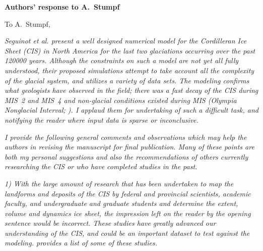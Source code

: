 


\textbf{Authors' response to A.~Stumpf}
\bigskip


\newcommand{\sechead}[1]{\bigskip\noindent\textbf{#1}}
\newcommand{\referee}[1]{\bigskip\textcolor{journalname}{\textit{#1}}}
\newcommand{\msquote}[1]{\begin{quote}\textit{#1}\end{quote}}

To A.~Stumpf,

\referee{%
    Seguinot et al. present a well designed numerical model for the Cordilleran
    Ice Sheet (CIS) in North America for the last two glaciations occurring
    over the past 120000 years. Although the constraints on such a model are
    not yet all fully understood, their proposed simulations attempt to take
    account all the complexity of the glacial system, and utilizes a variety of
    data sets. The modeling confirms what geologists have observed in the
    field; there was a fast decay of the CIS during MIS~2 and MIS~4 and
    non-glacial conditions existed during MIS (Olympia Nonglacial Interval;
    \citealp[e.g.,][]{Plouffe.Jette.1997}). I applaud them for undertaking of
    such a difficult task, and notifying the reader where input data is sparse
    or inconclusive.}

\referee{%
    I provide the following general comments and observations which may help
    the authors in revising the manuscript for final publication. Many of these
    points are both my personal suggestions and also the recommendations of
    others currently researching the CIS or who have completed studies in the
    past.}

\referee{%
    1) With the large amount of research that has been undertaken to map the
    landforms and deposits of the CIS by federal and provincial scientists,
    academic faculty, and undergraduate and graduate students and determine the
    extent, volume and dynamics ice sheet, the impression left on the reader by
    the opening sentence would be incorrect. These studies have greatly
    advanced our understanding of the CIS, and could be an important dataset to
    test against the modeling. \citet{Stumpf.etal.2014} provides a list of some
    of these studies.}

